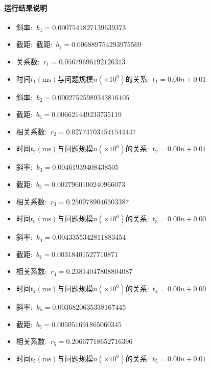 \documentclass[a4 paper,fontset=windows]{ctexart}
\begin{document}
	\paragraph{运行结果说明}
	\begin{itemize}
		\item 斜率:\ $k_1=0.0007541827139639373$
		\item 截距:\ 截距:\ $b_1=0.006889754293975569$
		\item 关系数:\ $r_1=0.05679696192126313$
		\item 时间$t_1(\mathrm{ms})$与问题规模$n(\times10^6)$的关系:\ $t_1=0.00n+0.01$
	\end{itemize}
	\bigskip
	\begin{itemize}
		\item 斜率:\ $k_2=0.00027525989343816105$
		\item 截距:\ $b_2=0.006621449233735119$
		\item 相关系数:\ $r_2=0.027747031541544447$
		\item 时间$t_2(\mathrm{ms})$与问题规模$n(\times10^6)$的关系:\ $t_2=0.00n+0.01$
	\end{itemize}
	\bigskip
	\begin{itemize}
		\item 斜率:\ $k_3=0.00461939408438505$
		\item 截距:\ $b_3=0.0027960100240966073$
		\item 相关系数:\ $r_3=0.2509789046503387$
		\item 时间$t_3(\mathrm{ms})$与问题规模$n(\times10^6)$的关系:\ $t_3=0.00n+0.00$
	\end{itemize}
	\bigskip
	\begin{itemize}
		\item 斜率:\ $k_4=0.0043355342811883454$
		\item 截距:\ $b_4=0.00318401527710871$
		\item 相关系数:\ $r_4=0.23814047808804087$
		\item 时间$t_4(\mathrm{ms})$与问题规模$n(\times10^6)$的关系:\ $t_4=0.00n+0.00$
	\end{itemize}
	\bigskip
	\begin{itemize}
		\item 斜率:\ $k_5=0.0036820635338167445$
		\item 截距:\ $b_5=0.005051691865060345$
		\item 相关系数:\ $r_5=0.20667718652716396$
		\item 时间$t_5(\mathrm{ms})$与问题规模$n(\times10^6)$的关系:\ $t_5=0.00n+0.01$
	\end{itemize}
	
\end{document}
